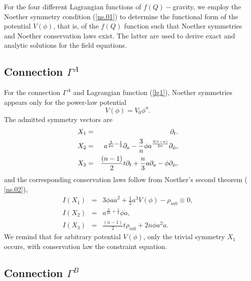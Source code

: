 \documentclass[onecolumn,superscriptaddress,secnumarabic,nobibnotes,aps,prd,nofootinbib,altaffilletter,11pt]{revtex4}
\begin{document}
For the four different Lagrangian functions of $f\left( Q\right) -$gravity,
we employ the Noether symmetry condition (\ref{ns.01}) to determine the
functional form of the potential $V\left( \phi \right) $, that is, of the $%
f\left( Q\right) $ function such that Noether symmetries and Noether conservation laws exist. The latter are used to derive exact and analytic
solutions for the field equations.

\subsection{Connection $\Gamma ^{A}$}

For the connection $\Gamma ^{A}$ and Lagrangian function (\ref{lg1}),
Noether symmetries appears only for the power-law potential 
\begin{equation}
V\left( \phi \right) =V_{0}\phi ^{n}.
\end{equation}
The admitted symmetry vectors are%
\begin{eqnarray*}
X_{1} &=&\partial _{t}. \\
X_{2} &=&a^{\frac{3}{2n}-\frac{1}{2}}\partial _{a}-\frac{3}{n}\phi a^{\frac{%
3(1-n)}{2n}}\partial _{\phi }, \\
X_{3} &=&\frac{\left( n-1\right) }{2}t\partial _{t}+\frac{n}{3}a\partial
_{a}-\phi \partial _{\phi },
\end{eqnarray*}%
and the corresponding conservation laws follow from Noether's second theorem (%
\ref{ns.02}), 
\begin{eqnarray}
I\left( X_{1}\right) &=&3\phi a\dot{a}^{2}+\frac{1}{2}a^{3}V\left( \phi
\right) -\rho _{m0}\equiv 0, \\
I\left( X_{2}\right) &=&a^{\frac{3}{2n}+\frac{1}{2}}\phi \dot{a}, \\
I\left( X_{3}\right) &=&\frac{\left( n-1\right) }{2}t\rho _{m0}+2n\phi a^{2}%
\dot{a}.
\end{eqnarray}
We remind that for arbitrary potential $V\left( \phi \right) $, only the
trivial symmetry $X_{1}$ occurs, with conservation law the constraint
equation.

\subsection{Connection $\Gamma ^{B}$}
\end{document}
